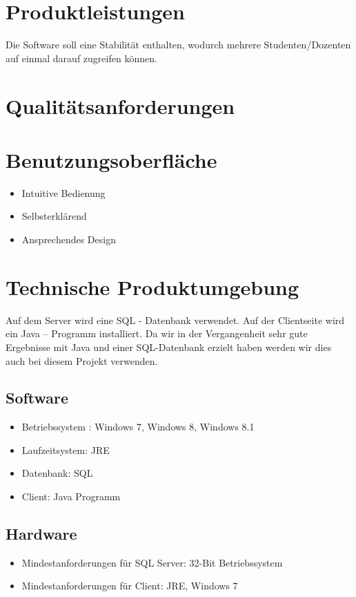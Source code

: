 \documentclass[a4paper,listof=leveldown,listof=numbered]{scrreprt}
\begin{document}
\chapter{Produktleistungen}
	Die Software soll eine Stabilität enthalten, wodurch mehrere Studenten/Dozenten auf einmal darauf zugreifen können.
	
\chapter{Qualitätsanforderungen}
	
	
\chapter{Benutzungsoberfläche}
	\begin{itemize}
		\item Intuitive Bedienung
		\item Selbsterklärend
		\item Ansprechendes Design
	\end{itemize}
	
\chapter{Technische Produktumgebung}
	Auf dem Server wird eine SQL - Datenbank verwendet. Auf der Clientseite wird ein Java – Programm installiert. Da wir in der Vergangenheit sehr gute Ergebnisse mit Java und einer SQL-Datenbank erzielt haben werden wir dies auch bei diesem Projekt verwenden.
	
	\section{Software}
	\begin{itemize}
		\item Betriebssystem : Windows 7, Windows 8, Windows 8.1
		\item Laufzeitsystem: JRE
		\item Datenbank: SQL
		\item Client: Java Programm
	\end{itemize}

	\section{Hardware}
	\begin{itemize}
		\item Mindestanforderungen für SQL Server: 32-Bit Betriebssystem
		\item Mindestanforderungen für Client: JRE, Windows 7
	\end{itemize}
\end{document}
